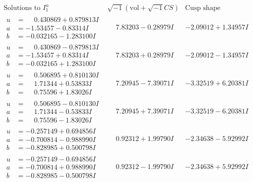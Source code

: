 \documentclass[1p]{elsarticle_modified}
\theoremstyle{definition}
\newcommand{\I}{\sqrt{-1}}
\begin{document}
$$\begin{array}{c|c|c}  
\text{Solutions to }I^u_{1}& \I (\text{vol} + \sqrt{-1}CS) & \text{Cusp shape}\\
 \hline 
\begin{aligned}
u &= \phantom{-}0.430869 + 0.879813 I \\
a &= -1.53457 - 0.83314 I \\
b &= -0.032165 - 1.283100 I\end{aligned}
 & \phantom{-}7.83203 - 0.28979 I & -2.09012 + 1.34957 I \\ \hline\begin{aligned}
u &= \phantom{-}0.430869 - 0.879813 I \\
a &= -1.53457 + 0.83314 I \\
b &= -0.032165 + 1.283100 I\end{aligned}
 & \phantom{-}7.83203 + 0.28979 I & -2.09012 - 1.34957 I \\ \hline\begin{aligned}
u &= \phantom{-}0.506895 + 0.810130 I \\
a &= \phantom{-}1.71344 + 0.53833 I \\
b &= \phantom{-}0.75596 + 1.83026 I\end{aligned}
 & \phantom{-}7.20945 - 7.39071 I & -3.32519 + 6.20381 I \\ \hline\begin{aligned}
u &= \phantom{-}0.506895 - 0.810130 I \\
a &= \phantom{-}1.71344 - 0.53833 I \\
b &= \phantom{-}0.75596 - 1.83026 I\end{aligned}
 & \phantom{-}7.20945 + 7.39071 I & -3.32519 - 6.20381 I \\ \hline\begin{aligned}
u &= -0.257149 + 0.694856 I \\
a &= -0.700814 - 0.988990 I \\
b &= -0.828985 + 0.500798 I\end{aligned}
 & \phantom{-}0.92312 + 1.99790 I & -2.34638 - 5.92992 I \\ \hline\begin{aligned}
u &= -0.257149 - 0.694856 I \\
a &= -0.700814 + 0.988990 I \\
b &= -0.828985 - 0.500798 I\end{aligned}
 & \phantom{-}0.92312 - 1.99790 I & -2.34638 + 5.92992 I \\ \hline\begin{aligned}

\end{aligned}
\end{array}$$
\end{document}
